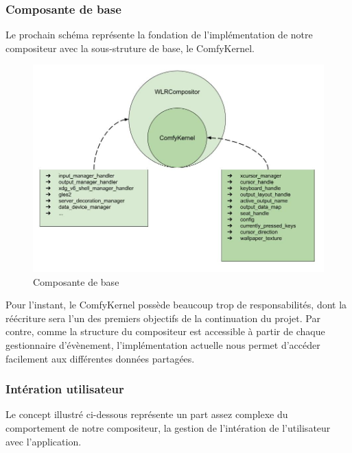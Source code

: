 \documentclass[titlepage]{article}
\begin{document}
\subsubsection{Composante de base}
\par
Le prochain schéma représente la fondation de l'implémentation de notre compositeur avec la sous-struture de base, le ComfyKernel.
\bigskip

\begin{figure}[H]
	\centering
	\includegraphics[width=\textwidth]{architecture_base.jpg}
	\caption{Composante de base}
\end{figure}

\par
Pour l'instant, le ComfyKernel possède beaucoup trop de responsabilités, dont la réécriture sera l'un des premiers objectifs de la continuation du projet. Par contre, comme la structure du compositeur est accessible à partir de chaque gestionnaire d'évènement, l'implémentation actuelle nous permet d'accéder facilement aux différentes données partagées.
\bigskip

\subsubsection{Intération utilisateur}
\par
Le concept illustré ci-dessous représente un part assez complexe du comportement de notre compositeur, la gestion de l'intération de l'utilisateur avec l'application.
\bigskip
\end{document}
